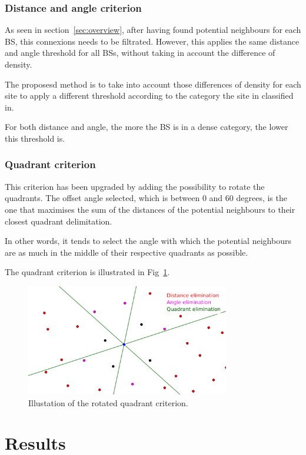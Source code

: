 \documentclass[lettersize,journal,english]{IEEEtran}
\begin{document}
        \subsubsection{Distance and angle criterion}
            As seen in section~\ref{sec:overview}, after having found potential neighbours for each BS, this connexions needs to be filtrated. However, this applies the same distance and angle threshold for all BSs, without taking in account the difference of density.

            The proposesd method is to take into account those differences of density for each site to apply a different threshold according to the category the site in classified in.

            For both distance and angle, the more the BS is in a dense category, the lower this threshold is.

        \subsubsection{Quadrant criterion}
            This criterion has been upgraded by adding the possibility to rotate the quadrants. The offset angle selected, which is between $0$ and $60$ degrees, is the one that maximises the sum of the distances of the potential neighbours to their closest quadrant delimitation.

            In other words, it tends to select the angle with which the potential neighbours are as much in the middle of their respective quadrants as possible.

            The quadrant criterion is illustrated in Fig~\ref{fig:crit_qua}.
            \begin{figure}
                \centering
                \includegraphics[width=3.5in]{images/illus_crit/quadrant_elim.png}
                \caption{Illustation of the rotated quadrant criterion.}
                \label{fig:crit_qua}
            \end{figure}

\section{Results\label{sec:res}}
\end{document}
